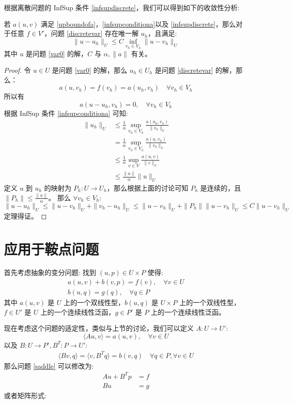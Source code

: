 \documentclass[lang=cn,a4paper,newtx]{elegantpaper}
\begin{document}
根据离散问题的 InfSup 条件 \eqref{infsupdiscrete}，我们可以得到如下的收敛性分析:
\begin{theorem}
    若 $a(u, v)$ 满足 \eqref{upboundofa}，\eqref{infsupconditiona}以及
    \eqref{infsupdiscrete}，那么对于任意 $f\in V'$，问题 \eqref{discretevar}
    存在唯一解 $u_h$，且满足:
    $$
    \|u - u_h\|_U \leq C \inf_{v_h\in V_h}\|u - v_h\|_U
    $$
    其中 $u$ 是问题 \eqref{var0} 的解，$C$ 与 $\alpha, \|a\|$ 有关。
\end{theorem}
\begin{proof}
    令 $u\in U$ 是问题 \eqref{var0} 的解，那么 $u_h\in U_h$ 是问题 \eqref{discretevar}
    的解，那么：
    $$ 
    a(u, v_h) = f(v_h) = a(u_h, v_h) \quad \forall v_h \in V_h
    $$
    所以有
    $$
    a(u - u_h, v_h) = 0, \quad \forall v_h \in V_h
    $$
    根据 InfSup 条件 \eqref{infsupconditiona} 可知:
    $$
    \begin{aligned}
    \|u_h\|_U & \leq \frac{1}{\alpha}\sup_{v_h \in V_h}\frac{a(u_h,
    v_h)}{\|v_h\|_{V}} \\
    & = \frac{1}{\alpha} \sup_{v_h \in V_h}\frac{a(u,
    v_h)}{\|v_h\|_{V}}\\
    & \leq \frac{1}{\alpha} \sup_{v \in V}\frac{a(u, v)}{\|v\|_{V}}\\
    & \leq \frac{\|a\|}{\alpha} \|u\|_U 
    \end{aligned}
    $$
    定义 $u$ 到 $u_h$ 的映射为 $P_h: U \to U_h$，那么根据上面的讨论可知 $P_h$
    是连续的，且 $\|P_h\| \leq \frac{\|a\|}{\alpha}$。
    那么 $\forall v_h \in V_h$:
    $$
    \|u - u_h\|_U \leq \|u - v_h\|_U + \|v_h - u_h\|_U \leq 
    \|u - v_h\|_U + \|P_h\|\|u - v_h\|_U \leq C \|u - v_h\|_U
    $$
    定理得证。
\end{proof}

\section{应用于鞍点问题}
首先考虑抽象的变分问题: 找到 $(u, p)\in U\times P$ 使得:
\begin{align}
\label{saddle}
a(u, v) + b(v, p) = f(v), \quad \forall v \in U\\
b(u, q) = g(q), \quad \forall q \in P
\end{align}
其中 $a(u, v)$ 是 $U$ 上的一个双线性型，$b(u, q)$ 是 $U\times P$ 上的一个双线性型，
$f\in U'$ 是 $U$ 上的一个连续线性泛函，$g\in P'$ 是 $P$ 上的一个连续线性泛函。

现在考虑这个问题的适定性，类似与上节的讨论，我们可以定义 $A: U \to U'$:
$$
\langle Au,  v\rangle = a(u, v), \quad \forall v \in U
$$
以及 $B: U \to P', B^T: P \to U'$:
$$
\begin{aligned}
\langle Bv,  q\rangle = \langle v,  B^T q\rangle = b(v, q) \quad \forall q \in
P, \forall v \in U
\end{aligned}
$$
那么问题 \eqref{saddle} 可以修改为: 
\begin{align}
\label{saddle1}
Au + B^Tp & = f\\
\label{saddle2}
B u & = g
\end{align}
或者矩阵形式:
\end{document}
